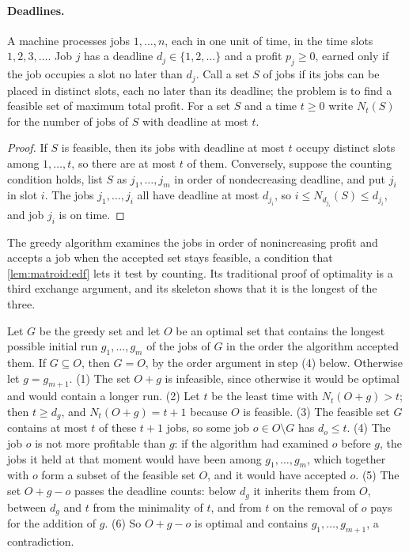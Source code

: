 \begin{refsection}
\paragraph{Deadlines.} A machine processes jobs $1,\dots,n$, each in one unit of time, in the time slots $1,2,3,\dots$. Job $j$ has a deadline $d_j\in\{1,2,\dots\}$ and a profit $p_j\ge0$, earned only if the job occupies a slot no later than $d_j$. Call a set $S$ of jobs  if its jobs can be placed in distinct slots, each no later than its deadline; the problem is to find a feasible set of maximum total profit. For a set $S$ and a time $t\ge0$ write $N_t(S)$ for the number of jobs of $S$ with deadline at most $t$.


\begin{proof}
If $S$ is feasible, then its jobs with deadline at most $t$ occupy distinct slots among $1,\dots,t$, so there are at most $t$ of them. Conversely, suppose the counting condition holds, list $S$ as $j_1,\dots,j_m$ in order of nondecreasing deadline, and put $j_i$ in slot $i$. The jobs $j_1,\dots,j_i$ all have deadline at most $d_{j_i}$, so $i\le N_{d_{j_i}}(S)\le d_{j_i}$, and job $j_i$ is on time.
\end{proof}

The greedy algorithm examines the jobs in order of nonincreasing profit and accepts a job when the accepted set stays feasible, a condition that \cref{lem:matroid:edf} lets it test by counting. Its traditional proof of optimality is a third exchange argument, and its skeleton shows that it is the longest of the three.

\begin{aside}
Let $G$ be the greedy set and let $O$ be an optimal set that contains the longest possible initial run $g_1,\dots,g_m$ of the jobs of $G$ in the order the algorithm accepted them. If $G\subseteq O$, then $G=O$, by the order argument in step (4) below. Otherwise let $g=g_{m+1}$. (1) The set $O+g$ is infeasible, since otherwise it would be optimal and would contain a longer run. (2) Let $t$ be the least time with $N_t(O+g)>t$; then $t\ge d_g$, and $N_t(O+g)=t+1$ because $O$ is feasible. (3) The feasible set $G$ contains at most $t$ of these $t+1$ jobs, so some job $o\in O\setminus G$ has $d_o\le t$. (4) The job $o$ is not more profitable than $g$: if the algorithm had examined $o$ before $g$, the jobs it held at that moment would have been among $g_1,\dots,g_m$, which together with $o$ form a subset of the feasible set $O$, and it would have accepted $o$. (5) The set $O+g-o$ passes the deadline counts: below $d_g$ it inherits them from $O$, between $d_g$ and $t$ from the minimality of $t$, and from $t$ on the removal of $o$ pays for the addition of $g$. (6) So $O+g-o$ is optimal and contains $g_1,\dots,g_{m+1}$, a contradiction.
\end{aside}


\end{refsection}
